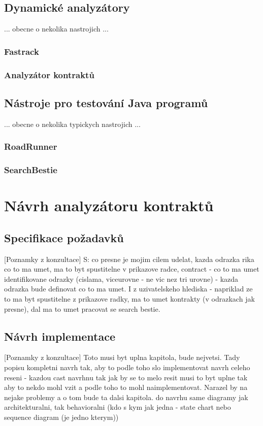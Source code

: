 \section{Dynamické analyzátory}
... obecne o nekolika nastrojich ...
\subsection{Fastrack}
\subsection{Analyzátor kontraktů}
\section{Nástroje pro testování Java programů}
... obecne o nekolika typickych nastrojich ...
\subsection{RoadRunner}
\subsection{SearchBestie}

\chapter{Návrh analyzátoru kontraktů}
\section{Specifikace požadavků}

[Poznamky z konzultace] S: co presne je mojim cilem udelat, kazda odrazka rika co to ma umet, ma to byt spustitelne v prikazove radce, contract - co to ma umet
identifikovane odrazky (cislama, viceurovne - ne vic nez tri urovne) - kazda odrazka bude definovat co to ma umet. I z uzivatelskeho hlediska - napriklad ze to ma byt spustitelne z prikazove radky, ma to umet kontrakty (v odrazkach jak presne), dal ma to umet pracovat se search bestie.

\section{Návrh implementace}

[Poznamky z konzultace] Toto musi byt uplna kapitola, bude nejvetsi. Tady popisu kompletni navrh tak, aby to podle toho slo implementovat
navrh celeho reseni - kazdou cast navrhnu tak jak by se to melo resit
musi to byt uplne tak aby to nekdo mohl vzit a podle toho to mohl naimplementovat. Narazel by na nejake problemy a o tom bude ta dalsi kapitola.
do navrhu same diagramy jak architekturalni, tak behavioralni (kdo s kym jak jedna - state chart nebo sequence diagram (je jedno kterym))

